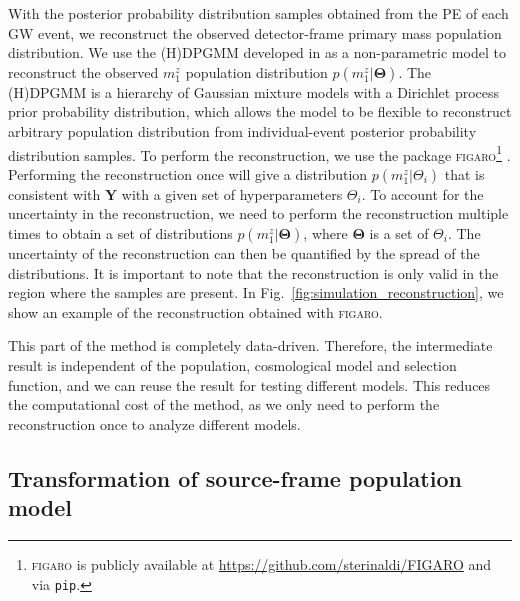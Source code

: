 \documentclass[sn-aps, pdflatex]{sn-jnl}
\begin{document}
With the posterior probability distribution samples obtained from the \ac{PE} of each \ac{GW} event, we reconstruct the observed detector-frame primary mass population distribution.
We use the \ac{(H)DPGMM} developed in \cite{Rinaldi:2021bhm} as a non-parametric model to reconstruct the observed $m^z_1$ population distribution $p(m^z_1|\mathbf{\Theta})$.
The \ac{(H)DPGMM} is a hierarchy of Gaussian mixture models with a Dirichlet process prior probability distribution, which allows the model to be flexible to reconstruct arbitrary population distribution from individual-event posterior probability distribution samples.
To perform the reconstruction, we use the package \textsc{figaro}\footnote{\textsc{figaro} is publicly available at \url{https://github.com/sterinaldi/FIGARO} and via \texttt{pip}.} \citep{Rinaldi:2024eep}.
Performing the reconstruction once will give a distribution $p(m^z_1|\Theta_i)$ that is consistent with $\mathbf{Y}$ with a given set of hyperparameters $\Theta_i$.
To account for the uncertainty in the reconstruction, we need to perform the reconstruction multiple times to obtain a set of distributions $p(m^z_1|\mathbf{\Theta})$, where $\mathbf{\Theta}$ is a set of $\Theta_i$.
The uncertainty of the reconstruction can then be quantified by the spread of the distributions.
It is important to note that the reconstruction is only valid in the region where the samples are present.
In Fig.~\ref{fig:simulation_reconstruction}, we show an example of the reconstruction obtained with \textsc{figaro}.

This part of the method is completely data-driven.
Therefore, the intermediate result is independent of the population, cosmological model and selection function, and we can reuse the result for testing different models.
This reduces the computational cost of the method, as we only need to perform the reconstruction once to analyze different models.

\subsection{Transformation of source-frame population model}
\label{sec:transformation}
\end{document}
